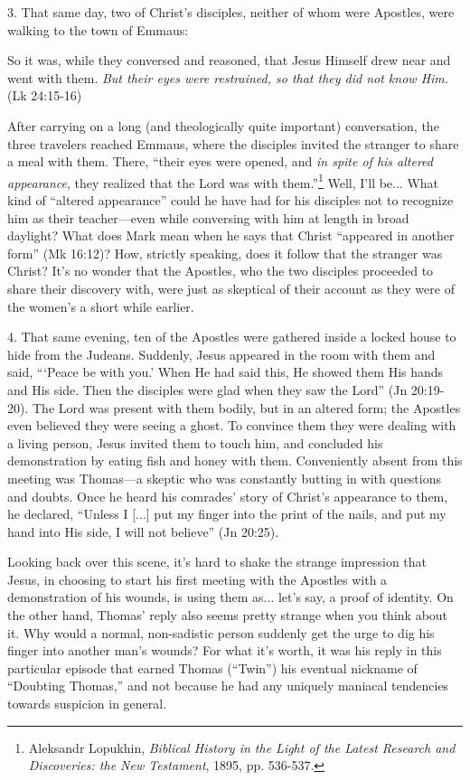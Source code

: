 3. That same day, two of Christ's disciples, neither of whom were Apostles, were walking to the town of Emmaus:

\begin{smallquote}
    So it was, while they conversed and reasoned, that Jesus Himself drew near and went with them. \emph{But their eyes were restrained, so that they did not know Him.} (Lk 24:15-16)
\end{smallquote}
After carrying on a long (and theologically quite important) conversation, the three travelers reached Emmaus, where the disciples invited the stranger to share a meal with them. There, ``their eyes were opened, and \emph{in spite of his altered appearance}, they realized that the Lord was with them.''\footnote{Aleksandr Lopukhin, \emph{Biblical History in the Light of the Latest Research and Discoveries: the New Testament}, 1895, pp. 536-537.} Well, I'll be... What kind of ``altered appearance'' could he have had for his disciples not to recognize him as their teacher---even while conversing with him at length in broad daylight? What does Mark mean when he says that Christ ``appeared in another form'' (Mk 16:12)? How, strictly speaking, does it follow that the stranger was Christ? It's no wonder that the Apostles, who the two disciples proceeded to share their discovery with, were just as skeptical of their account as they were of the women's a short while earlier.

4. That same evening, ten of the Apostles were gathered inside a locked house to hide from the Judeans. Suddenly, Jesus appeared in the room with them and said, ```Peace be with you.' When He had said this, He showed them His hands and His side. Then the disciples were glad when they saw the Lord'' (Jn 20:19-20). The Lord was present with them bodily, but in an altered form; the Apostles even believed they were seeing a ghost. To convince them they were dealing with a living person, Jesus invited them to touch him, and concluded his demonstration by eating fish and honey with them. Conveniently absent from this meeting was Thomas---a skeptic who was constantly butting in with questions and doubts. Once he heard his comrades' story of Christ's appearance to them, he declared, ``Unless I [...] put my finger into the print of the nails, and put my hand into His side, I will not believe'' (Jn 20:25).

Looking back over this scene, it's hard to shake the strange impression that Jesus, in choosing to start his first meeting with the Apostles with a demonstration of his wounds, is using them as... let's say, a proof of identity. On the other hand, Thomas' reply also seems pretty strange when you think about it. Why would a normal, non-sadistic person suddenly get the urge to dig his finger into another man's wounds? For what it's worth, it was his reply in this particular episode that earned Thomas (``Twin'') his eventual nickname of ``Doubting Thomas,'' and not because he had any uniquely maniacal tendencies towards suspicion in general.

